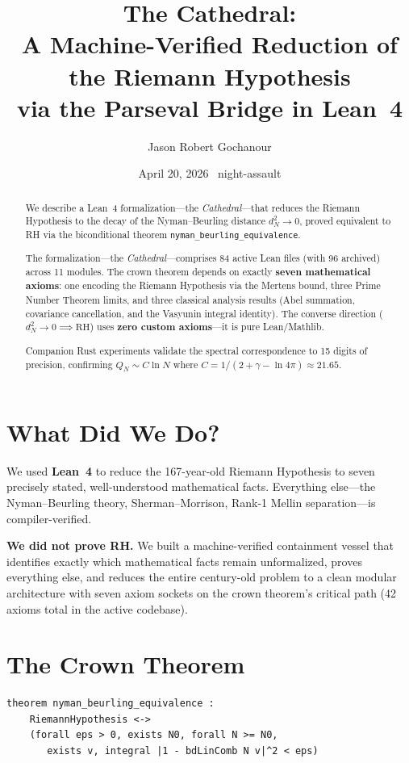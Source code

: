 \documentclass[12pt,a4paper]{article}
\title{%
  The Cathedral:\\[4pt]
  \large A Machine-Verified Reduction of the Riemann Hypothesis\\[2pt]
  \large via the Parseval Bridge in Lean~4%
}
\author{Jason Robert Gochanour}
\date{April 20, 2026 \textemdash\ night-assault}
\begin{document}
\maketitle

\begin{abstract}
We describe a Lean~4 formalization---the \emph{Cathedral}---that reduces
the Riemann Hypothesis to the decay of the Nyman--Beurling distance
$d_N^2 \to 0$, proved equivalent to RH via the biconditional theorem
\texttt{nyman\_beurling\_equivalence}.

The formalization---the \emph{Cathedral}---comprises 84 active Lean files
(with 96 archived) across 11 modules. The crown theorem depends
on exactly \textbf{seven mathematical axioms}: one encoding the Riemann
Hypothesis via the Mertens bound, three Prime Number Theorem limits,
and three classical analysis results (Abel summation, covariance
cancellation, and the Vasyunin integral identity).
The converse direction ($d_N^2 \to 0 \implies \mathrm{RH}$) uses
\textbf{zero custom axioms}---it is pure Lean/Mathlib.

Companion Rust experiments validate the spectral correspondence to
15 digits of precision, confirming $Q_N \sim C \ln N$ where
$C = 1/(2 + \gamma - \ln 4\pi) \approx 21.65$.
\end{abstract}

\section{What Did We Do?}

We used \textbf{Lean~4} to reduce the 167-year-old Riemann Hypothesis
to seven precisely stated, well-understood mathematical facts. Everything
else---the Nyman--Beurling theory, Sherman--Morrison,
Rank-1 Mellin separation---is compiler-verified.

\textbf{We did not prove RH.} We built a machine-verified containment
vessel that identifies exactly which mathematical facts remain unformalized,
proves everything else, and reduces the entire century-old problem to
a clean modular architecture with seven axiom sockets on the crown
theorem's critical path (42 axioms total in the active codebase).

\section{The Crown Theorem}

\begin{verbatim}
theorem nyman_beurling_equivalence :
    RiemannHypothesis <->
    (forall eps > 0, exists N0, forall N >= N0,
       exists v, integral |1 - bdLinComb N v|^2 < eps)
\end{verbatim}
\end{document}
